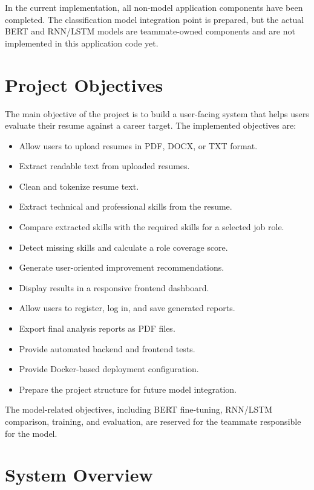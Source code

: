 \documentclass[12pt,a4paper]{article}
\begin{document}
In the current implementation, all non-model application components have been completed. The classification model integration point is prepared, but the actual BERT and RNN/LSTM models are teammate-owned components and are not implemented in this application code yet.

\section{Project Objectives}

The main objective of the project is to build a user-facing system that helps users evaluate their resume against a career target. The implemented objectives are:

\begin{itemize}
    \item Allow users to upload resumes in PDF, DOCX, or TXT format.
    \item Extract readable text from uploaded resumes.
    \item Clean and tokenize resume text.
    \item Extract technical and professional skills from the resume.
    \item Compare extracted skills with the required skills for a selected job role.
    \item Detect missing skills and calculate a role coverage score.
    \item Generate user-oriented improvement recommendations.
    \item Display results in a responsive frontend dashboard.
    \item Allow users to register, log in, and save generated reports.
    \item Export final analysis reports as PDF files.
    \item Provide automated backend and frontend tests.
    \item Provide Docker-based deployment configuration.
    \item Prepare the project structure for future model integration.
\end{itemize}

The model-related objectives, including BERT fine-tuning, RNN/LSTM comparison, training, and evaluation, are reserved for the teammate responsible for the model.

\section{System Overview}
\end{document}
